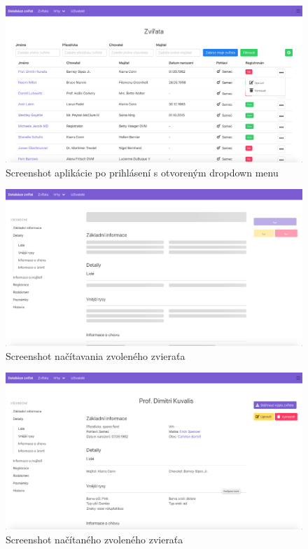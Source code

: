 \begin{figure}[H]
	\includegraphics[width=1.0\textwidth]{media/priloha/vseobecne/3.png}
	\caption{Screenshot aplikácie po prihlásení s otvoreným dropdown menu}
\end{figure}

\begin{figure}[H]
	\includegraphics[width=1.0\textwidth]{media/priloha/zviera/1.png}
	\caption{Screenshot načítavania zvoleného zvieraťa}
\end{figure}

\vspace*{\fill}

\begin{figure}[H]
	\includegraphics[width=1.0\textwidth]{media/priloha/zviera/2.png}
	\caption{Screenshot načítaného zvoleného zvieraťa}
\end{figure}

